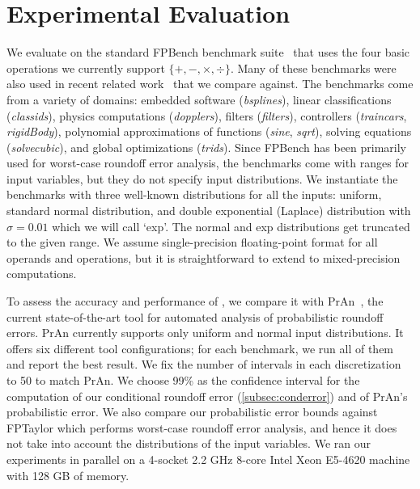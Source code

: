 \section{Experimental Evaluation}
\label{sec:evaluation}


We evaluate \Tool on the standard FPBench
benchmark suite~\cite{fpbench,fpbench-web} that uses the four basic operations we
currently support $\{+,-,\times,\div\}$.
%
Many of these benchmarks were also used in recent related work~\cite{probdaisy}
that we compare against.
%
The benchmarks come from a variety of domains: embedded software (\emph{bsplines}), linear classifications (\emph{classids}), physics computations (\emph{dopplers}), filters (\emph{filters}), controllers (\emph{traincars}, \emph{rigidBody}), polynomial approximations of functions (\emph{sine}, \emph{sqrt}), solving equations (\emph{solvecubic}), and global optimizations (\emph{trids}).
%
Since FPBench has been primarily used for worst-case roundoff error
analysis,  the benchmarks come with ranges for input variables, but they do not specify
input distributions.
%
We instantiate the benchmarks with three well-known distributions for all the
inputs: uniform, standard normal distribution,  and double exponential (\ie Laplace)
distribution with $\sigma=0.01$ which we will call `exp'. 
%
The normal and exp distributions get truncated to the given range.
%
We assume single-precision floating-point format for all
operands and operations, but it is straightforward to
extend \Tool to mixed-precision computations.


To assess the accuracy and performance of \Tool, we compare it with
PrAn~\cite{probdaisy}, the current state-of-the-art tool for automated analysis
of probabilistic roundoff errors.
%
PrAn currently supports only uniform and normal input distributions.
%
It offers six different tool configurations; for each benchmark, we run
all of them and report the best result.
%
We fix the number of intervals in each discretization to 50 to match PrAn.
%
We choose 99\% as the confidence interval for the computation of our conditional roundoff error (\cref{subsec:conderror}) and of PrAn's probabilistic error.
We also compare our probabilistic error bounds against FPTaylor which performs worst-case roundoff error analysis, and hence it does not
take into account the distributions of the input variables.
%
We ran our experiments in parallel on a 4-socket 2.2 GHz 8-core Intel Xeon
E5-4620 machine with 128 GB of memory.





